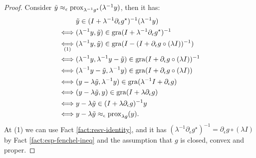 \documentclass[12pt]{article}
\begin{document}
        \begin{proof}
            Consider $\tilde y \approx_\epsilon \operatorname{prox}_{\lambda^{-1}g^\star}(\lambda^{-1}y)$, then it has: 
            \begin{align*}
                & 
                \tilde y 
                \in (I + \lambda^{-1}\partial_\epsilon g^\star)^{-1}(\lambda^{-1}y)
                \\
                \iff &
                (\lambda^{-1}y, \tilde y)\in 
                \operatorname{gra}(I + \lambda^{-1}\partial_\epsilon g^\star)^{-1}
                \\
                \underset{(1)}{\iff} &
                (\lambda^{-1}y, \tilde y)\in 
                \operatorname{gra}(I - (I + \partial_\epsilon g\circ(\lambda I))^{-1})
                \\
                \iff &
                (\lambda^{-1}y, \lambda^{-1}y - \tilde y)\in 
                \operatorname{gra}(I + \partial_\epsilon g\circ(\lambda I))^{-1}
                \\
                \iff &
                (\lambda^{-1}y - \tilde y, \lambda^{-1}y)\in 
                \operatorname{gra}(I + \partial_\epsilon g\circ(\lambda I))
                \\
                \iff &
                (y - \lambda\tilde y, \lambda^{-1}y)\in 
                \operatorname{gra}(\lambda^{-1}I + \partial_\epsilon g)
                \\
                \iff &
                (y - \lambda\tilde y, y)\in 
                \operatorname{gra}(I + \lambda\partial_\epsilon g)
                \\
                \iff& 
                y - \lambda \tilde y \in 
                (I + \lambda \partial_\epsilon g)^{-1}y
                \\
                \iff& 
                y - \lambda \tilde y \approx_\epsilon \operatorname{prox}_{\lambda g}(y). 
            \end{align*}
            At (1) we can use Fact \ref{fact:resv-identity}, and it has $(\lambda^{-1}\partial_\epsilon g^\star)^{-1} = \partial_\epsilon g\circ(\lambda I)$ by Fact \ref{fact:esp-fenchel-ineq} and the assumption that $g$ is closed, convex and proper. 
        \end{proof}
\end{document}
